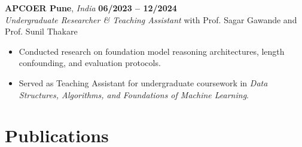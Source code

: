 \documentclass[10pt,letterpaper]{article}
\begin{document}
\vspace{3pt}

\textbf{APCOER Pune}, \textit{India} \hfill \textbf{06/2023 -- 12/2024} \\
\textit{Undergraduate Researcher \& Teaching Assistant} with Prof. Sagar Gawande and Prof. Sunil Thakare
\begin{itemize}
    \item Conducted research on foundation model reasoning architectures, length confounding, and evaluation protocols.
    \item Served as Teaching Assistant for undergraduate coursework in \textit{Data Structures, Algorithms, and Foundations of Machine Learning}.
\end{itemize}

\section*{Publications}
\end{document}

